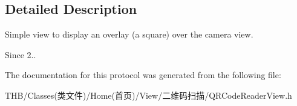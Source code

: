 \subsection{Detailed Description}
Simple view to display an overlay (a square) over the camera view. \begin{DoxySince}{Since}
2.. 
\end{DoxySince}


The documentation for this protocol was generated from the following file\+:\begin{DoxyCompactItemize}
\item 
T\+H\+B/\+Classes(类文件)/\+Home(首页)/\+View/二维码扫描/Q\+R\+Code\+Reader\+View.\+h\end{DoxyCompactItemize}
